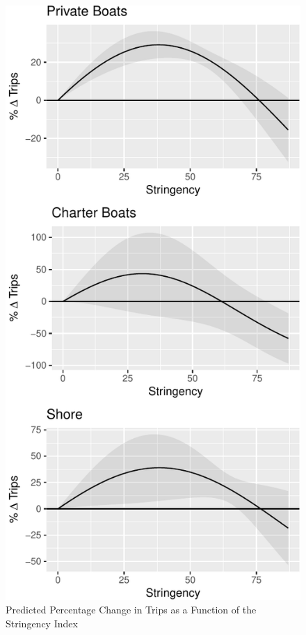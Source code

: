 \documentclass[12pt]{article}
\begin{document}
\begin{figure}
\centering
\includegraphics{C19PolicyRec_files/figure-latex/tripStringRel-1.pdf}
\caption{Predicted Percentage Change in Trips as a Function of the
Stringency Index}\label{fig:tripStringRel}
\end{figure}
\end{document}
